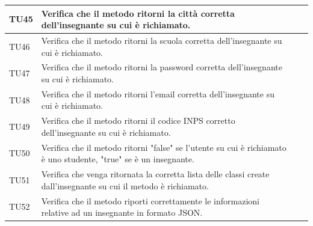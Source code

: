 \begin{longtable}{|>{\centering\arraybackslash}m{1.6cm}|>{\centering\arraybackslash}m{6.41cm}|>{\centering\arraybackslash}m{3.1cm}| c |}
		TU45 & Verifica che il metodo ritorni la città corretta dell'insegnante su cui è richiamato.\\ \hline
		\rowcolor{LightGray}
		TU46 & Verifica che il metodo ritorni la scuola corretta dell'insegnante su cui è richiamato. \\ \hline
		TU47 & Verifica che il metodo ritorni la password corretta dell'insegnante su cui è richiamato. \\ \hline
		\rowcolor{LightGray}
		TU48 & Verifica che il metodo ritorni l'email corretta dell'insegnante su cui è richiamato. \\ \hline
		TU49 & Verifica che il metodo ritorni il codice INPS corretto dell'insegnante su cui è richiamato. \\ \hline
		\rowcolor{LightGray}
		TU50 & Verifica che il metodo ritorni "false" se l'utente su cui è richiamato è uno studente, "true" se è un insegnante. \\ \hline
		TU51 & Verifica che venga ritornata la corretta lista delle classi create dall'insegnante su cui il metodo è richiamato.  \\ \hline
		\rowcolor{LightGray}
		TU52 & Verifica che il metodo riporti correttamente le informazioni relative ad un insegnante in formato JSON. \\ \hline	
		

\end{longtable}
